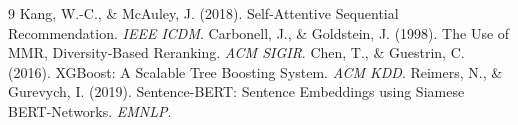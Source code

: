 \documentclass[10pt, twocolumn, a4paper]{article}
\begin{document}
\begin{thebibliography}{9}
 Kang, W.-C., \& McAuley, J. (2018). Self-Attentive Sequential Recommendation. \textit{IEEE ICDM}.
 Carbonell, J., \& Goldstein, J. (1998). The Use of MMR, Diversity-Based Reranking. \textit{ACM SIGIR}.
 Chen, T., \& Guestrin, C. (2016). XGBoost: A Scalable Tree Boosting System. \textit{ACM KDD}.
 Reimers, N., \& Gurevych, I. (2019). Sentence-BERT: Sentence Embeddings using Siamese BERT-Networks. \textit{EMNLP}.
\end{thebibliography}
\end{document}
